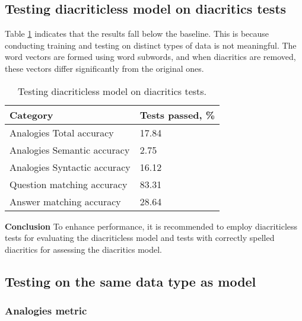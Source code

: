 \documentclass{article}
\begin{document}
\newpage

\subsection{Testing diacriticless model on diacritics tests}

Table \ref{testing_diacriticless_diacritics} indicates that the results fall below the baseline.
This is because conducting training and testing on distinct types of data is not meaningful.
The word vectors are formed using word subwords, and when diacritics are removed, these vectors differ significantly from the original ones.

\begin{table}[h]
  \centering
  \begin{tabular}{ |p{4.5cm}||p{2.5cm}| }
    \hline
    Category                     & Tests passed, \% \\
    \hline
    Analogies Total accuracy     & 17.84            \\
    Analogies Semantic accuracy  & 2.75             \\
    Analogies Syntactic accuracy & 16.12            \\
    \hline
    \hline
    Question matching accuracy   & 83.31            \\
    Answer matching accuracy     & 28.64            \\
    \hline
  \end{tabular}
  \caption{Testing diacriticless model on diacritics tests.}
  \label{testing_diacriticless_diacritics}
\end{table}

\textbf{Conclusion} To enhance performance, it is recommended to employ diacriticless tests for evaluating the diacriticless model and tests with correctly spelled diacritics for assessing the diacritics model.



\subsection{Testing on the same data type as model}

\subsubsection{Analogies metric}
\end{document}
